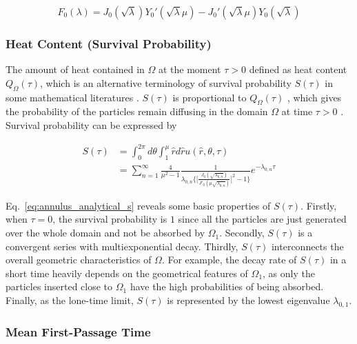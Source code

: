 \begin{equation}\label{eq:eigenfunction}
  F_0(\lambda) = J_0(\sqrt{\lambda}) Y_0'(\sqrt{\lambda} \mu) -
  J_0'(\sqrt{\lambda} \mu) Y_0(\sqrt{\lambda})
\end{equation}


\subsubsection{Heat Content (Survival Probability)}

The amount of heat contained in $\Omega$ at the moment $\tau > 0$
defined as heat content $Q_{\Omega}(\tau)$, which is an alternative
terminology of survival probability $S(\tau)$ in some mathematical
literatures \cite{birkhoff1954note} \cite{van1994heat}
\cite{gilkey1994heat}. $S(\tau)$ is proportional to $Q_{\Omega}(\tau)$
\cite{kalinay2011survival}, which gives the probability of the
particles remain diffusing in the domain $\Omega$ at time $\tau > 0$
\cite{aalen2008survival}. Survival probability can be expressed by

\begin{equation}\label{eq:annulus_analytical_s}
  \begin{split}
    S(\tau) &= \int_{0}^{2\pi} d\theta \int_{1}^{\mu} \hat r d \hat r
    u(\hat r, \theta, \tau)\\ &= \sum_{n=1}^{\infty} \frac{4}{\mu^2 -
      1} \frac{1}{\lambda_{0,n}
      \bigg\{\bigg[\frac{J_0(\sqrt{\lambda_{0,n}})}{J'_0(\mu
          \sqrt{\lambda_{0,n}})}\bigg]^2 -1\bigg\}} e^{-\lambda_{0, n}
      \tau}
  \end{split}
\end{equation}

Eq.~\ref{eq:annulus_analytical_s} reveals some basic properties of
$S(\tau)$. Firstly, when $\tau=0$, the survival probability is $1$
since all the particles are just generated over the whole domain and
not be absorbed by $\Omega_1$. Secondly, $S(\tau)$ is a convergent
series with multiexponential decay. Thirdly, $S(\tau)$ interconnects
the overall geometric characteristics of $\Omega$. For example, the
decay rate of $S(\tau)$ in a short time heavily depends on the
geometrical features of $\Omega_1$, as only the particles inserted
close to $\Omega_1$ have the high probabilities of being
absorbed. Finally, as the lone-time limit, $S(\tau)$ is represented by
the lowest eigenvalue $\lambda_{0,1}$.


\subsubsection{Mean First-Passage Time}

